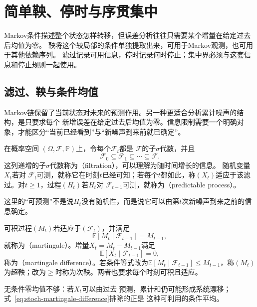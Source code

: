 \section{简单鞅、停时与序贯集中}
\label{sec:stoch-martingales-stopping-sequential-concentration}

Markov条件描述整个状态怎样转移，但误差分析往往只需要某个增量在给定过去后均值为零。
鞅将这个较局部的条件单独提取出来，可用于Markov观测，也可用于其他依赖序列。
滤过记录可用信息，停时记录何时停止；集中界必须与这套信息和停止规则一起使用。

\subsection{滤过、鞅与条件均值}

Markov链保留了当前状态对未来的预测作用。另一种更适合分析累计噪声的结构，是只要求每个
新增误差在给定过去后均值为零。信息限制需要一个明确对象，才能区分“当前已经看到”与“新噪声到来前就已确定”。
\begin{definition}[滤过、适应与可预测性]
  \label{def:stoch-filtration-adaptation-predictability}
在概率空间
$(\Omega,\mathcal{F},\mathbb{P})$上，令每个$\mathcal{F}_t$都是
$\mathcal{F}$的子$\sigma$代数，并且
\[
  \mathcal{F}_0\subseteq\mathcal{F}_1\subseteq\cdots\subseteq\mathcal{F}.
\]
这列递增的子$\sigma$代数称为（filtration），可以理解为随时间增长的信息。
随机变量$X_t$若对
$\mathcal{F}_t$可测，就称它在时刻$t$已经可知；若每个$t$都如此，称$(X_t)$适应于该滤过。对$t\geq1$，过程$(H_t)$若$H_t$对
$\mathcal{F}_{t-1}$可测，就称为（predictable process）。
\end{definition}
这里的“可预测”不是说$H_t$没有随机性，而是说它可以由第$t$次新噪声到来之前的信息确定。

\begin{definition}[鞅与鞅差]
  \label{def:stoch-martingale}
可积过程$(M_t)$若适应于$(\mathcal{F}_t)$，并满足
\begin{equation}
  \mathbb{E}[M_t\mid\mathcal{F}_{t-1}]=M_{t-1},
  \label{eq:stoch-martingale-definition}
\end{equation}
就称为（martingale）。增量$X_t=M_t-M_{t-1}$满足
\begin{equation}
  \mathbb{E}[X_t\mid\mathcal{F}_{t-1}]=0,
  \label{eq:stoch-martingale-difference}
\end{equation}
称为（martingale difference）。若条件等式改为\(\mathbb E[M_t\mid\mathcal F_{t-1}]\leq M_{t-1}\)，称\((M_t)\)为超鞅；改为\(\geq\)时称为次鞅。两者也要求每个时刻可积且适应。
\end{definition}
无条件零均值不够：若$X_t$可以由过去
预测，累计和仍可能形成系统漂移；式~\eqref{eq:stoch-martingale-difference}排除的正是
这种可利用的条件平均。

